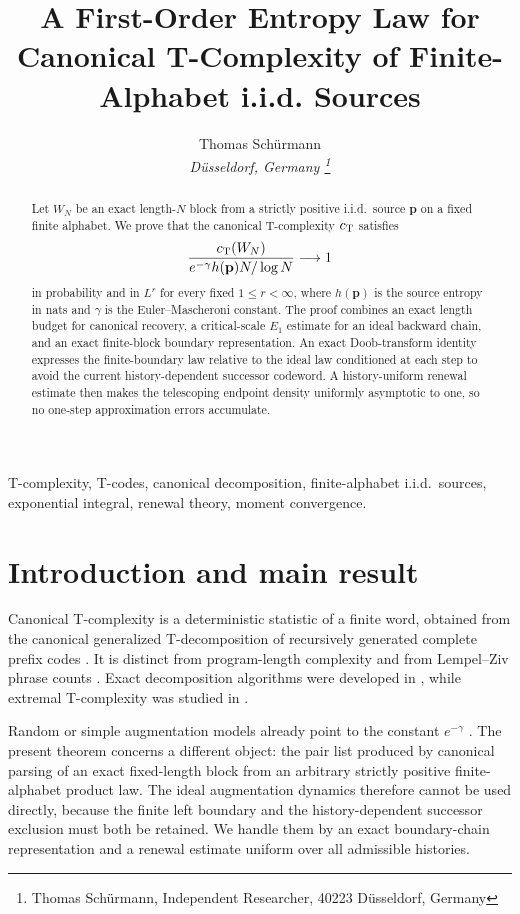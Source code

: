 \documentclass[journal]{IEEEtran}
\title{A First-Order Entropy Law for Canonical T-Complexity of Finite-Alphabet i.i.d. Sources}
\author{Thomas Sch\"urmann\\\it{D\"usseldorf, Germany}%
\thanks{Thomas Sch\"urmann, Independent Researcher, 40223 D\"usseldorf, Germany}}
\theoremstyle{plain}
\theoremstyle{definition}
\theoremstyle{remark}
\newcommand{\hp}{h(\mathbf p)}
\newcommand{\cT}{c_{\rm T}}
\begin{document}
\maketitle

\begin{abstract}
Let $W_N$ be an exact length-$N$ block from a strictly positive i.i.d.\ source $\mathbf p$ on a fixed finite alphabet.  We prove that the canonical T-complexity $\cT$ satisfies
\begin{equation*}
 \frac{\cT(W_N)}{e^{-\gamma}\hp N/\log N}\longrightarrow1
\end{equation*}
in probability and in $L^r$ for every fixed $1\le r<\infty$, where $\hp$ is the source entropy in nats and $\gamma$ is the Euler--Mascheroni constant.  The proof combines an exact length budget for canonical recovery, a critical-scale $E_1$ estimate for an ideal backward chain, and an exact finite-block boundary representation.  An exact Doob-transform identity expresses the finite-boundary law relative to the ideal law conditioned at each step to avoid the current history-dependent successor codeword.  A history-uniform renewal estimate then makes the telescoping endpoint density uniformly asymptotic to one, so no one-step approximation errors accumulate.
\end{abstract}

\begin{IEEEkeywords}
T-complexity, T-codes, canonical decomposition, finite-alphabet i.i.d.\ sources, exponential integral, renewal theory, moment convergence.
\end{IEEEkeywords}

\section{Introduction and main result}\label{sec:intro}

Canonical T-complexity is a deterministic statistic of a finite word, obtained from the canonical generalized T-decomposition of recursively generated complete prefix codes \cite{Titchener1984,Titchener1996,Gunther1998,NicolescuTitchener1998,TitchenerEtAl2005}.  It is distinct from program-length complexity \cite{Kolmogorov1965} and from Lempel--Ziv phrase counts \cite{LempelZiv1976,ZivLempel1978}.  Exact decomposition algorithms were developed in \cite{YangSpeidel2005Jucs,YangSpeidel2005,RebenichEtAl2014}, while extremal T-complexity was studied in \cite{Speidel2008,SpeidelGulliver2012,ClarkTeutsch2015}.

Random or simple augmentation models already point to the constant $e^{-\gamma}$ \cite{HamanoYamamoto2009,Hamano2009,GulliverSpeidel2012Random}.  The present theorem concerns a different object: the pair list produced by canonical parsing of an exact fixed-length block from an arbitrary strictly positive finite-alphabet product law.  The ideal augmentation dynamics therefore cannot be used directly, because the finite left boundary and the history-dependent successor exclusion must both be retained.  We handle them by an exact boundary-chain representation and a renewal estimate uniform over all admissible histories.
\end{document}
